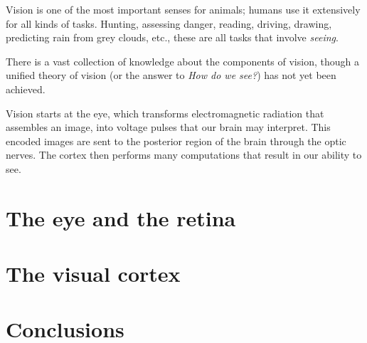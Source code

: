 Vision is one of the most important senses for animals; humans use it extensively for all kinds of tasks. Hunting, assessing danger, reading, driving, drawing, predicting rain from grey clouds, etc., these are all tasks that involve \emph{seeing}. 

There is a vast collection of knowledge about the components of vision, though a unified theory of vision (or the answer to \emph{How do we see?}) has not yet been achieved.

Vision starts at the eye, which transforms electromagnetic radiation that assembles an image, into voltage pulses that our brain may interpret. This encoded images are sent to the posterior region of the brain through the optic nerves. The cortex then performs many computations that result in our ability to see.

\section{The eye and the retina}
\label{sec:vision:eye}


\section{The visual cortex}
\label{sec:vision:cortex}


\section{Conclusions}
\label{sec:vision:conclusions}


%
